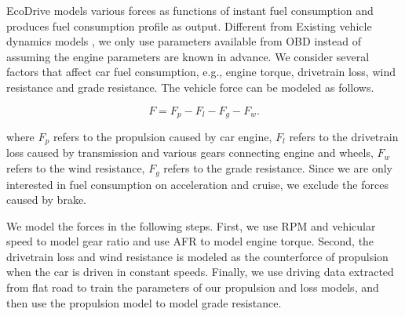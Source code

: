 

EcoDrive models various forces as functions of instant fuel consumption and produces fuel consumption profile as output. 
Different from Existing vehicle dynamics models \cite{koprubasi2008modeling},  
we only use parameters available from OBD instead of assuming 
the engine parameters are known in advance. 
We consider several factors that affect car fuel
consumption, e.g., engine torque, 
drivetrain loss, wind resistance and grade resistance.   
The vehicle force can be modeled as follows. 

\begin{equation}
F = F_p - F_l - F_g - F_w.
\end{equation}

where $F_p$ refers to the propulsion caused by car engine, 
$F_l$ refers to the drivetrain loss caused by transmission and various gears 
connecting engine and wheels,
$F_w$ refers to the wind resistance,
$F_g$ refers to the grade resistance. 
Since we are only interested in fuel consumption on acceleration
and cruise, we exclude the forces caused by brake. 

We model the forces in the following steps.  
First, we use RPM and vehicular speed to model gear ratio and use 
AFR to model engine torque. 
Second, the drivetrain loss and wind resistance is modeled as
the counterforce of propulsion when the car is driven in constant speeds. 
Finally, we use driving data extracted from flat road to 
train the parameters of our propulsion and 
loss models, and then use the propulsion model
to model grade resistance.




